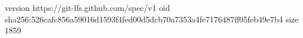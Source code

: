 version https://git-lfs.github.com/spec/v1
oid sha256:526cafc856a59016d1593f4fed00d5dcb70a7353a4fe7176487ff05feb49e7b4
size 1859
